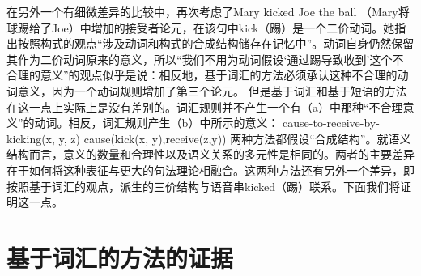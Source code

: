     在另外一个有细微差异的比较中，\citet[--140]{Goldberg95a}再次考虑了Mary kicked Joe the ball （Mary将球踢给了Joe）中增加的接受者论元，在该句中kick（踢）是一个二价动词。她指出按照构式的观点“涉及动词和构式的合成结构储存在记忆中”。动词自身仍然保留其作为二价动词原来的意义，所以“我们不用为动词假设‘通过踢导致收到’这个不合理的意义”的观点似乎是说：相反地，基于词汇的方法必须承认这种不合理的动词意义，因为一个动词规则增加了第三个论元。
    但是基于词汇和基于短语的方法在这一点上实际上是没有差别的。词汇规则并不产生一个有（a）中那种“不合理意义”的动词。相反，词汇规则产生（b）中所示的意义：
\eal
\ex cause-to-receive-by-kicking(x, y, z) 
\ex cause(kick(x, y),receive(z,y))
\zl
两种方法都假设“合成结构”。就语义结构而言，意义的数量和合理性以及语义关系的多元性是相同的。两者的主要差异在于如何将这种表征与更大的句法理论相融合。这两种方法还有另外一个差异，即按照基于词汇的观点，派生的三价结构与语音串kicked（踢）联系。下面我们将证明这一点。
 
\section{基于词汇的方法的证据}

